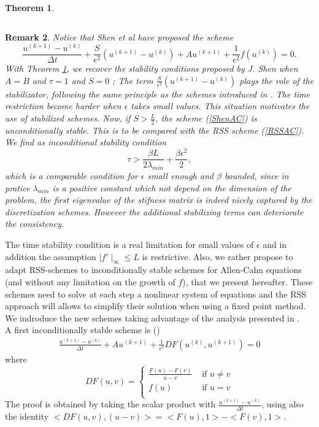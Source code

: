 \documentclass[11pt]{article}
\newtheorem{theorem}{Theorem}[section]
\newtheorem{remark}[theorem]{Remark}
\newcommand{\Frac}[2] {\frac{\textstyle #1} {\textstyle #2}}
\begin{document}
{\begin{theorem}
\begin{itemize}
$$$$
\end{itemize} 
\label{Stab_AC}
\end{theorem}
\begin{remark}
Notice that Shen {\it et al }\cite{JShenACCH} have proposed the scheme
 \begin{equation}
 \Frac{u^{(k+1)}-u^{(k)}}{\Delta t} +\Frac{S}{\epsilon^2} (u^{(k+1)}-u^{(k)}) +Au^{(k+1)}+\Frac{1}{\epsilon^2}f(u^{(k)}) =0.
 \label{ShenAC}
 \end{equation}
With Theorem \ref{Stab_AC}, we recover the stability conditions proposed by J. Shen when $A=B$ and $\tau=1$ and $S=0$ ; The term $\Frac{S}{\epsilon^2} (u^{(k+1)}-u^{(k)})$ plays the role of the stabilizator, following the same principle as the schemes introduced in \cite{BCostaPHD,CDGT}. The time restriction become harder when $\epsilon$
takes small values. This situation motivates the use of stabilized schemes.
Now, if $S>\Frac{L}{2}$, the scheme (\ref{ShenAC}) is unconditionally stable. This is to be compared with the RSS scheme (\ref{RSSAC}). We find as inconditional stability condition
$$
\tau > \Frac{\beta L}{2\lambda_{min}}+\Frac{\beta\epsilon^2}{2},
$$
which is a comparable condition for $\epsilon$ small enough and $\beta$ bounded, since in pratice $\lambda_{min}$ is a positive constant which not depend on the dimension of the problem,  the first eigenvalue of the stifness matrix is indeed nicely captured by the discretization schemes.  However the additional stabilizing terms can deteriorate the consistency. 
\end{remark}

The time stability condition is a real limitation for small values of $\epsilon$ and in addition the assumption $\mid f'\mid_{\infty}\le L$ is restrictive. Also, we rather propose to adapt RSS-schemes to inconditionally stable schemes for Allen-Cahn equations (and without any limitation on the growth of $f$), that we present hereafter. These schemes need to solve at each step a nonlinear system of equations and the RSS approach will allows to simplify their solution when using a fixed point method. We indroduce the new schemes taking advantage of the analysis presented in \cite{Elliot,Eyre}.\\

A first inconditionally stable scheme is (\cite{Elliott})
\begin{eqnarray}
 \Frac{u^{(k+1)}-u^{(k)}}{\Delta t} +Au^{(k+1)}+\Frac{1}{\epsilon^2}DF(u^{(k)},u^{(k+1)})=0
 \label{ISAC1}
 \end{eqnarray}
where
$$
DF(u,v)=\left\{
\begin{array}{ll}
\Frac{F(u)-F(v)}{u-v} & \mbox{ if } u\neq v\\
f(u) & \mbox{ if } u= v\\
\end{array}
\right.
$$
The proof is obtained by taking the scalar product with  
$\Frac{u^{(k+1)}-u^{(k)}}{\Delta t}$, using also the identity
$<DF(u,v),(u-v)>=<F(u),1>-<F(v),1>$.\\ 

}
\end{document}
